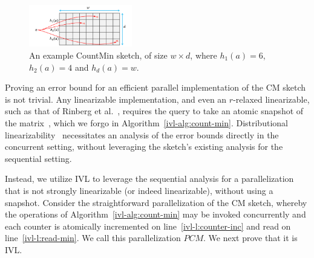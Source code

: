   \begin{figure}
    \begin{center}
     \includegraphics[width=0.4\textwidth,trim=10 0 30 10,clip]{graphics/ivl/cmSketch.png}
      \caption[The LOF caption]{An example CountMin sketch, of size $w \times d$, where $h_1(a)=6$, $h_2(a)=4$ and $h_d(a)=w$.\footnotemark}
     \label{ivl-img:cmSketch}
    \end{center}
  \end{figure}

Proving an error bound for an efficient parallel implementation of the CM sketch is not trivial.
Any linearizable implementation, and even an $r$-relaxed linearizable, such as that of
Rinberg et al.~\cite{rinberg2019fast}, requires the query to take an
atomic snapshot of the matrix~\cite{ovens2019strongly}, which we forgo in Algorithm~\ref{ivl-alg:count-min}.
Distributional linearizability~\cite{alistarh2018distributionally} necessitates an analysis of the error bounds
directly in the concurrent setting, without leveraging the sketch's existing analysis for the sequential setting.

Instead, we utilize IVL to leverage the sequential analysis for a parallelization that
is not strongly linearizable (or indeed linearizable), without using a
snapshot. Consider the straightforward parallelization of the CM sketch,
whereby the operations of Algorithm~\ref{ivl-alg:count-min} may be invoked concurrently
and each counter is atomically incremented  on
line~\ref{ivl-l:counter-inc} and read on line~\ref{ivl-l:read-min}. We call
this parallelization $PCM$. We next prove that it is IVL.%


